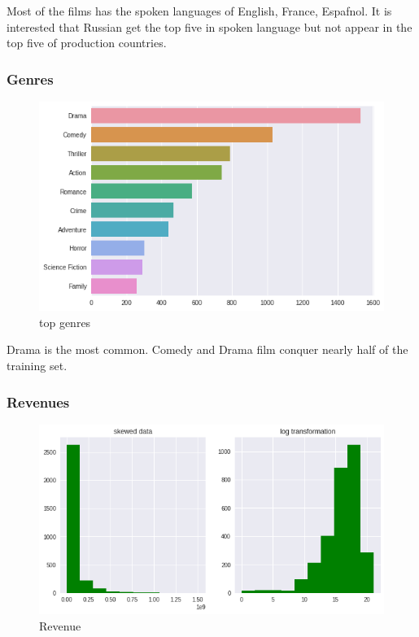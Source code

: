 \documentclass{article}
\begin{document}
Most of the films has the spoken languages of English, France, Espafnol. It is interested that Russian get the top five in spoken language but not appear in the top five of production countries.

\subsubsection{Genres}
\begin{figure}[h]
  \centering
  \includegraphics[scale=0.7]{genres.png}
  \caption{top genres}
\end{figure}

Drama is the most common. Comedy and Drama film conquer nearly half of the training set.

\pagebreak

\subsubsection{Revenues}
\begin{figure}[h]
  \centering
  \includegraphics[scale=0.7]{revenue.png}
  \caption{Revenue}
\end{figure}
\end{document}
